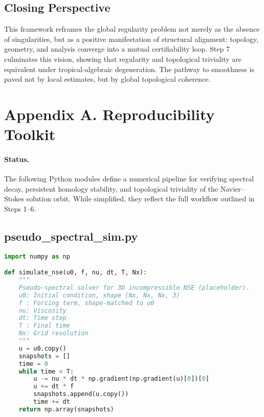 \documentclass[11pt]{article}
\theoremstyle{definition}
\begin{document}
\subsection*{Closing Perspective}

This framework reframes the global regularity problem not merely as the absence of singularities, but as a positive manifestation of structural alignment: topology, geometry, and analysis converge into a mutual certifiability loop. Step 7 culminates this vision, showing that regularity and topological triviality are equivalent under tropical-algebraic degeneration. The pathway to smoothness is paved not by local estimates, but by global topological coherence.




\section{Appendix A. Reproducibility Toolkit}
\label{sec:appendixA}

\paragraph{Status.}
The following Python modules define a numerical pipeline for verifying spectral decay, persistent homology stability, and topological triviality of the Navier--Stokes solution orbit. While simplified, they reflect the full workflow outlined in Steps 1–6.

\subsection*{pseudo\_spectral\_sim.py}
\begin{lstlisting}[language=Python]
import numpy as np

def simulate_nse(u0, f, nu, dt, T, Nx):
    """
    Pseudo-spectral solver for 3D incompressible NSE (placeholder).
    u0: Initial condition, shape (Nx, Nx, Nx, 3)
    f : Forcing term, shape-matched to u0
    nu: Viscosity
    dt: Time step
    T : Final time
    Nx: Grid resolution
    """
    u = u0.copy()
    snapshots = []
    time = 0
    while time < T:
        u -= nu * dt * np.gradient(np.gradient(u)[0])[0]
        u += dt * f
        snapshots.append(u.copy())
        time += dt
    return np.array(snapshots)
\end{lstlisting}
\end{document}
